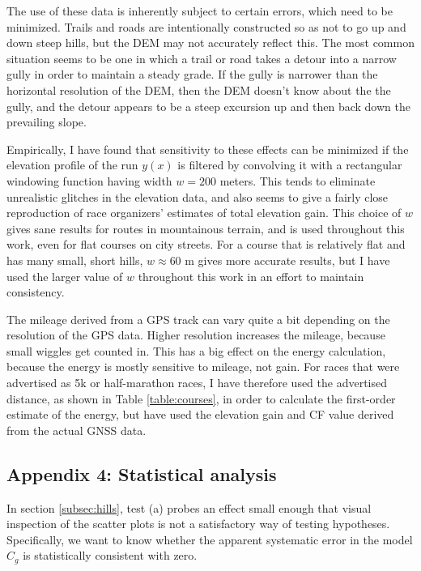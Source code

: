 \documentclass[10pt,letterpaper]{article}
\begin{document}
The use of these data is inherently subject to certain errors, which need to be minimized.
Trails and roads are intentionally constructed so as not to go up and down steep hills, but
the DEM may not accurately reflect this. The most common situation seems to be one in which
a trail or road takes a detour into a narrow gully in order to maintain a steady grade.
If the gully is narrower than the horizontal resolution of the DEM, then the DEM doesn't know about the the gully, and
the detour appears to be a steep excursion up and then back down the prevailing slope.

Empirically, I have found that sensitivity to these effects can be minimized if the elevation
profile of the run $y(x)$ is filtered by convolving it with a rectangular windowing function having width
$w=200$ meters. This tends to eliminate unrealistic glitches in the elevation data, and also seems to give
a fairly close reproduction of race organizers' estimates of total elevation gain. This choice of $w$ gives
sane results for routes in mountainous terrain, and is used throughout this work, even for flat courses
on city streets. For a course that is relatively flat and has many small, short hills, $w\approx60$ m gives
more accurate results, but I have used the larger value of $w$ throughout this work in an effort to maintain
consistency.

The mileage derived from a GPS track can vary quite a bit depending on the resolution of the GPS data.
Higher resolution increases the mileage, because small wiggles get counted in. This has a big effect on
the energy calculation, because the energy is mostly sensitive to mileage, not gain. For races
that were advertised as 5k or half-marathon races, I have therefore used the advertised distance,
as shown in Table \ref{table:courses},
in order to calculate the first-order estimate of the energy, but have used the elevation gain and
CF value derived from the actual GNSS data.

\subsection*{Appendix 4: Statistical analysis}

In section \ref{subsec:hills}, test (a) probes an effect small enough that visual inspection of the scatter plots is
not a satisfactory way of testing hypotheses. Specifically, we want to know whether
the apparent systematic error in the model $C_g$ is statistically consistent with zero.
\end{document}
